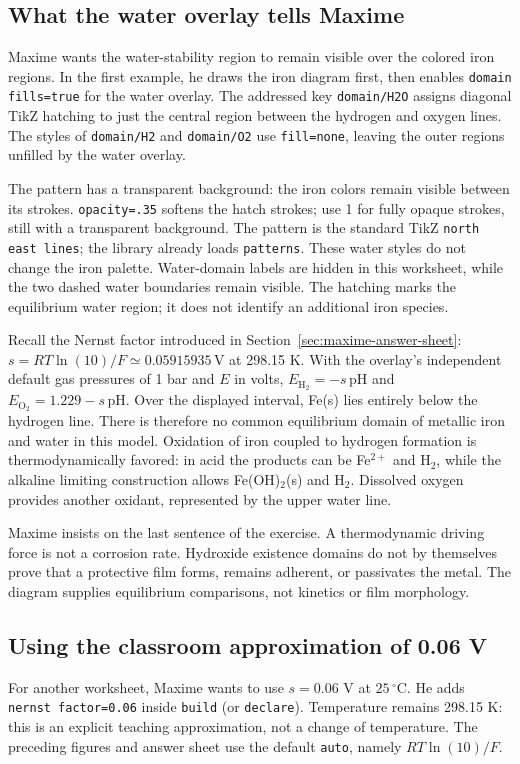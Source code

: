 \documentclass[a4paper,11pt]{ltxdoc}
\begin{document}
\subsection{What the water overlay tells Maxime}
Maxime wants the water-stability region to remain visible over the colored iron
regions. In the first example, he draws the iron diagram first, then enables
\texttt{domain fills=true} for the water overlay. The addressed key
\texttt{domain/H2O} assigns diagonal TikZ hatching to just the central region
between the hydrogen and oxygen lines. The styles of \texttt{domain/H2} and
\texttt{domain/O2} use \texttt{fill=none}, leaving the outer regions unfilled
by the water overlay.

The pattern has a transparent background: the iron colors remain visible between
its strokes. \texttt{opacity=.35} softens the hatch strokes; use 1 for
fully opaque strokes, still with a transparent background. The pattern is the
standard TikZ \texttt{north east lines}; the library already loads
\texttt{patterns}. These water styles do not change the iron palette.
Water-domain labels are hidden in this worksheet, while the two dashed water
boundaries remain visible. The hatching marks the equilibrium water region; it
does not identify an additional iron species.

Recall the Nernst factor introduced in Section~\ref{sec:maxime-answer-sheet}:
$s=RT\ln(10)/F\simeq0.05915935\,\mathrm V$ at 298.15 K.
With the overlay's independent default gas pressures of 1 bar and $E$ in volts,
$E_{\mathrm{H_2}}=-s\,\mathrm{pH}$ and
$E_{\mathrm{O_2}}=1.229-s\,\mathrm{pH}$.
Over the displayed interval, Fe(s) lies entirely below the hydrogen line.
There is therefore no common equilibrium domain of metallic iron and water in
this model. Oxidation of iron coupled to hydrogen formation is thermodynamically
favored: in acid the products can be Fe$^{2+}$ and H$_2$, while the alkaline
limiting construction allows Fe(OH)$_2$(s) and H$_2$. Dissolved oxygen provides
another oxidant, represented by the upper water line.

Maxime insists on the last sentence of the exercise. A thermodynamic driving
force is not a corrosion rate. Hydroxide existence domains do not by themselves
prove that a protective film forms, remains adherent, or passivates the metal.
The diagram supplies equilibrium comparisons, not kinetics or film morphology.

\subsection{Using the classroom approximation of 0.06 V}
For another worksheet, Maxime wants to use $s=0.06$ V at $25\,{}^\circ$C.
He adds \texttt{nernst factor=0.06} inside \texttt{build} (or \texttt{declare}).
Temperature remains 298.15 K: this is an explicit teaching approximation, not
a change of temperature. The preceding figures and answer sheet use the default
\texttt{auto}, namely $RT\ln(10)/F$.
\end{document}
